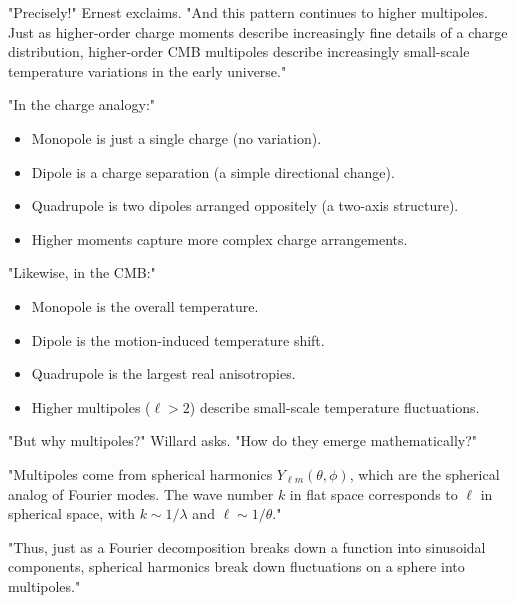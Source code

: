 "Precisely!" Ernest exclaims. "And this pattern continues to higher multipoles. Just as higher-order charge moments describe increasingly fine details of a charge distribution, higher-order CMB multipoles describe increasingly small-scale temperature variations in the early universe."

"In the charge analogy:"
\begin{itemize}
    \item Monopole is just a single charge (no variation).
    \item Dipole is a charge separation (a simple directional change).
    \item Quadrupole is two dipoles arranged oppositely (a two-axis structure).
    \item Higher moments capture more complex charge arrangements.
\end{itemize}

"Likewise, in the CMB:"
\begin{itemize}
    \item Monopole is the overall temperature.
    \item Dipole is the motion-induced temperature shift.
    \item Quadrupole is the largest real anisotropies.
    \item Higher multipoles (\(\ell > 2\)) describe small-scale temperature fluctuations.
\end{itemize}

"But why multipoles?" Willard asks. "How do they emerge mathematically?"

"Multipoles come from spherical harmonics \( Y_{\ell m}(\theta, \phi) \), which are the spherical analog of Fourier modes. The wave number \( k \) in flat space corresponds to \( \ell \) in spherical space, with \( k \sim 1/\lambda \) and \( \ell \sim 1/\theta \)."

"Thus, just as a Fourier decomposition breaks down a function into sinusoidal components, spherical harmonics break down fluctuations on a sphere into multipoles."

